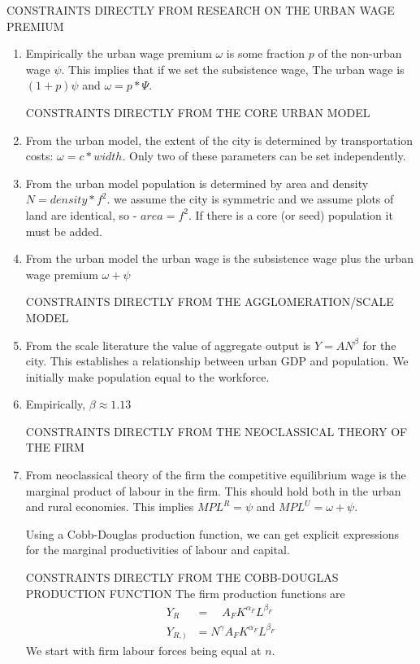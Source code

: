 CONSTRAINTS DIRECTLY FROM RESEARCH ON THE URBAN WAGE PREMIUM
\begin{enumerate}
     \item  Empirically the urban wage premium  $\omega$ is some fraction $p$ of the non-urban wage $\psi$.   This implies that if we set the subsistence wage, The urban wage is $(1+p)\psi$ and $\omega= p*\Psi$.


CONSTRAINTS DIRECTLY FROM THE CORE URBAN MODEL
    \item From the urban model, the extent of the city is determined by transportation costs:   $\omega =c*width$.  Only two of these parameters can be set independently.

    \item From the urban model population is determined by area and density   $N=density* f^2$. we assume the city is symmetric  and we assume plots  of land are identical, so  - $area=f^2$. If there is a core (or seed) population it must be added.  
   
    \item From the urban model the urban wage is the subsistence wage plus the urban wage premium $\omega+\psi$ 

CONSTRAINTS DIRECTLY FROM THE AGGLOMERATION/SCALE MODEL
    \item From the scale literature the value of aggregate output is $Y=AN^\beta$ for the city. This establishes a relationship between urban GDP and population. We initially make population equal to the workforce. 

    \item Empirically, $\beta \approx 1.13$


CONSTRAINTS DIRECTLY FROM THE NEOCLASSICAL THEORY OF THE FIRM
    \item From neoclassical theory of the firm the competitive equilibrium wage is the  marginal product of labour in the firm.      This should hold both in the urban and rural economies. This implies       $ MPL^R=\psi$  and $ MPL^U=\omega+\psi $.

    Using a Cobb-Douglas production function, we can get explicit expressions for the marginal productivities of labour and capital. 

CONSTRAINTS DIRECTLY FROM THE COBB-DOUGLAS PRODUCTION FUNCTION
The firm production functions are 
\begin{align}
Y_R  &= \quad  A_FK^{\alpha_F}L^{\beta_F}\\
Y_{R, )} &= N^\gamma A_FK^{\alpha_F}L^{\beta_F}
\end{align}
We start with firm labour forces  being equal at $n$.


\end{enumerate}
